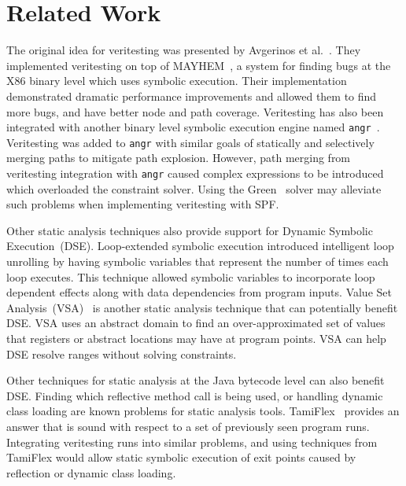 \section{Related Work}
%
The original idea for veritesting was presented by Avgerinos et al.~\cite{veritesting}.
%
They implemented veritesting on top of MAYHEM~\cite{mayhem}, a system for finding bugs at the X86 binary level which uses symbolic execution.
%
Their implementation demonstrated dramatic performance improvements and allowed them to find more bugs, and have better node and path coverage.
%
Veritesting has also been integrated with another binary level symbolic execution engine named {\tt angr}~\cite{angr}.
%
Veritesting was added to {\tt angr} with similar goals of statically and selectively merging paths to mitigate path explosion.
%
However, path merging from veritesting integration with {\tt angr} caused complex expressions to be introduced which overloaded the constraint solver.
%
Using the Green~\cite{green} solver may alleviate such problems when implementing veritesting with SPF.
%
%

Other static analysis techniques also provide support for Dynamic Symbolic Execution~(DSE).
%
Loop-extended symbolic execution introduced intelligent loop unrolling by having symbolic variables that represent the number of times each loop executes.
%
This technique allowed symbolic variables to incorporate loop dependent effects along with data dependencies from program inputs.
%
Value Set Analysis~(VSA)~\cite{vsa} is another static analysis technique that can potentially benefit DSE.
%
VSA uses an abstract domain to find an over-approximated set of values that registers or abstract locations may have at program points.
%
VSA can help DSE resolve ranges without solving constraints.

%
Other techniques for static analysis at the Java bytecode level can also benefit DSE.
%
Finding which reflective method call is being used, or handling dynamic class loading are known problems for static analysis tools.
%
TamiFlex~\cite{tamiflex} provides an answer that is sound with respect to a set of previously seen program runs.
%
Integrating veritesting runs into similar problems, and using techniques from TamiFlex would allow static symbolic execution of exit points caused by reflection or dynamic class loading. 
